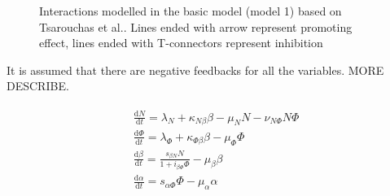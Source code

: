 \documentclass[12pt,a4paper]{report}
\begin{document}
\begin{figure}
    \begin{center}
    \end{center}

    \caption[Interactions modelled in the basic model]%
    {Interactions modelled in the basic model (model 1) based on Tsarouchas et al.\cite{ref:Tsarouchas}. Lines ended with arrow represent promoting effect, lines ended with T-connectors represent inhibition}
    \label{fig:m1}

\end{figure}

It is assumed that there are negative feedbacks for all the variables. MORE DESCRIBE.

\begin{align}
    \label{eq:model1}
    \begin{split}
        &\frac{\mathrm{d} N}{\mathrm{d} t}=\lambda_N+\kappa_{N\beta}\beta-\mu_NN-\nu_{N\Phi}N\Phi\\
        &\frac{\mathrm{d} \Phi}{\mathrm{d} t}=\lambda_\Phi+\kappa_{\Phi\beta}\beta-\mu_\Phi\Phi\\
        &\frac{\mathrm{d} \beta}{\mathrm{d} t}=\frac{s_{\beta N}N}{1+i_{\beta\Phi}\Phi}-\mu_\beta\beta\\
        &\frac{\mathrm{d} \alpha}{\mathrm{d} t}=s_{\alpha\Phi}\Phi-\mu_\alpha\alpha
    \end{split}
\end{align}
\end{document}
